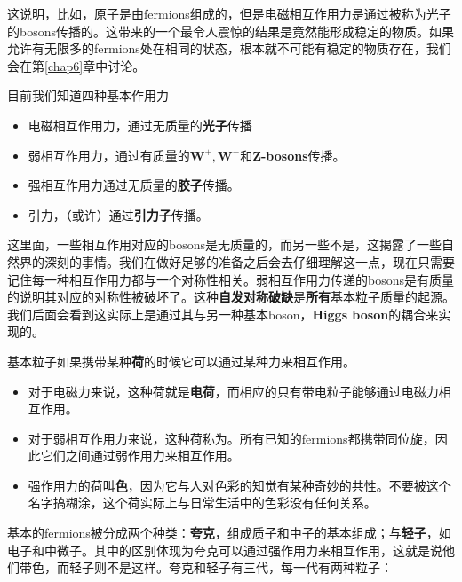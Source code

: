 这说明，比如，原子是由fermions组成的，但是电磁相互作用力是通过被称为光子的bosons传播的。这带来的一个最令人震惊的结果是竟然能形成稳定的物质。如果允许有无限多的fermions处在相同的状态，根本就不可能有稳定的物质存在，我们会在第\ref{chap6}章中讨论。

目前我们知道四种基本作用力

\begin{itemize}
\item 电磁相互作用力，通过无质量的{\bfseries 光子}传播
\item 弱相互作用力，通过有质量的$\mathbf{W^+, W^-}$和\textbf{Z-bosons}传播。
\item 强相互作用力通过无质量的{\bfseries 胶子}传播。
\item 引力，（或许）通过{\bfseries 引力子}传播。
\end{itemize}

这里面，一些相互作用对应的bosons是无质量的，而另一些不是，这揭露了一些自然界的深刻的事情。我们在做好足够的准备之后会去仔细理解这一点，现在只需要记住每一种相互作用力都与一个对称性相关。弱相互作用力传递的bosons是有质量的说明其对应的对称性被破坏了。这种{\bfseries 自发对称破缺}是{\bfseries 所有}基本粒子质量的起源。我们后面会看到这实际上是通过其与另一种基本boson，{\bfseries Higgs boson}的耦合来实现的。

基本粒子如果携带某种{\bfseries 荷}的时候它可以通过某种力来相互作用。

\begin{itemize}
\item 对于电磁力来说，这种荷就是{\bfseries 电荷}，而相应的只有带电粒子能够通过电磁力相互作用。
\item 对于弱相互作用力来说，这种荷称为。所有已知的fermions都携带同位旋，因此它们之间通过弱作用力来相互作用。
\item 强作用力的荷叫{\bfseries 色}，因为它与人对色彩的知觉有某种奇妙的共性。不要被这个名字搞糊涂，这个荷实际上与日常生活中的色彩没有任何关系。
\end{itemize}

基本的fermions被分成两个种类：{\bfseries 夸克}，组成质子和中子的基本组成；与{\bfseries 轻子}，如电子和中微子。其中的区别体现为夸克可以通过强作用力来相互作用，这就是说他们带色，而轻子则不是这样。夸克和轻子有三代，每一代有两种粒子：

